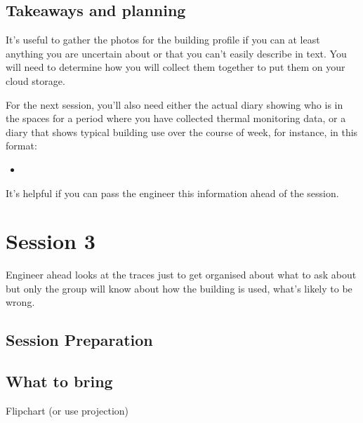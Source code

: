 \documentclass[letterpaper,10pt,english]{jupyterBook}
\begin{document}
\sphinxstepscope


\section{Takeaways and planning}
\label{\detokenize{session2/details/takeaways-and-planning:takeaways-and-planning}}\label{\detokenize{session2/details/takeaways-and-planning::doc}}
\sphinxAtStartPar
It’s useful to gather the photos for the building profile if you can \sphinxhyphen{} at least anything you are uncertain about or that you can’t easily describe in text.  You will need to determine how you will collect them together to put them on your cloud storage.

\sphinxAtStartPar
For the next session, you’ll also need either the actual diary showing who is in the spaces for a period where you have collected thermal monitoring data, or a diary that shows typical building use over the course of week, for instance, in this format:
\begin{itemize}
\item {} 
\sphinxAtStartPar
{}

\end{itemize}

\sphinxAtStartPar
It’s helpful if you can pass the engineer this information ahead of the session.



\sphinxstepscope


\chapter{Session 3}
\label{\detokenize{session3/session3:session-3}}\label{\detokenize{session3/session3::doc}}
\sphinxAtStartPar
Engineer ahead looks at the traces just to get organised about what to ask about \sphinxhyphen{} but only the group will know about how the building is used, what’s likely to be wrong.

\sphinxstepscope


\section{Session Preparation}
\label{\detokenize{session3/details/preparation:session-preparation}}\label{\detokenize{session3/details/preparation::doc}}

\section{What to bring}
\label{\detokenize{session3/details/preparation:what-to-bring}}
\sphinxAtStartPar
Flipchart (or use projection)
\end{document}
